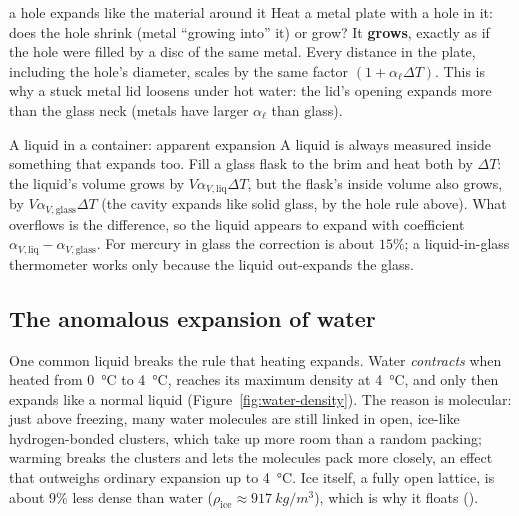 
\begin{trapbox}{a hole expands like the material around it}
Heat a metal plate with a hole in it: does the hole shrink (metal ``growing into'' it) or grow? It
\textbf{grows}, exactly as if the hole were filled by a disc of the same metal. Every distance in the
plate, including the hole's diameter, scales by the same factor $(1+\alpha_\ell\Delta T)$. This is why a
stuck metal lid loosens under hot water: the lid's opening expands more than the glass neck (metals
have larger $\alpha_\ell$ than glass).
\end{trapbox}

\begin{remarkbox}{A liquid in a container: apparent expansion}
A liquid is always measured inside something that expands too. Fill a glass flask to the brim and heat
both by $\Delta T$: the liquid's volume grows by $V\alpha_{V,\text{liq}}\Delta T$, but the flask's
inside volume also grows, by $V\alpha_{V,\text{glass}}\Delta T$ (the cavity expands like solid glass,
by the hole rule above). What overflows is the difference, so the liquid appears to expand with
coefficient $\alpha_{V,\text{liq}}-\alpha_{V,\text{glass}}$. For mercury in glass the correction is
about $15\%$; a liquid-in-glass thermometer works only because the liquid out-expands the glass.
\end{remarkbox}

\subsection{The anomalous expansion of water}

One common liquid breaks the rule that heating expands. Water \emph{contracts} when heated from
\SI{0}{\celsius} to \SI{4}{\celsius}, reaches its maximum density at \SI{4}{\celsius}, and only then
expands like a normal liquid (Figure~\ref{fig:water-density}). The reason is molecular: just above
freezing, many water molecules are still linked in open, ice-like hydrogen-bonded clusters, which take
up more room than a random packing; warming breaks the clusters and lets the molecules pack more
closely, an effect that outweighs ordinary expansion up to \SI{4}{\celsius}. Ice itself, a fully open
lattice, is about $9\%$ less dense than water ($\rho_{\text{ice}}\approx\SI{917}{kg/m^3}$), which is why
it floats ().

